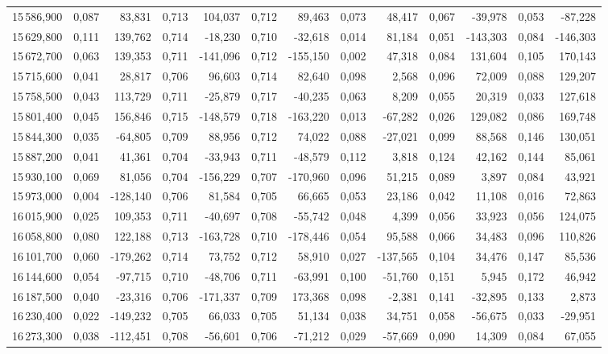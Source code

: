 \begin{longtable}{rrrrrrrrrrrrr}
15\,586,900 & 0,087 & 83,831 & 0,713 & 104,037 & 0,712 & 89,463 & 0,073 & 48,417 & 0,067 & -39,978 & 0,053 & -87,228\\
15\,629,800 & 0,111 & 139,762 & 0,714 & -18,230 & 0,710 & -32,618 & 0,014 & 81,184 & 0,051 & -143,303 & 0,084 & -146,303\\
15\,672,700 & 0,063 & 139,353 & 0,711 & -141,096 & 0,712 & -155,150 & 0,002 & 47,318 & 0,084 & 131,604 & 0,105 & 170,143\\
15\,715,600 & 0,041 & 28,817 & 0,706 & 96,603 & 0,714 & 82,640 & 0,098 & 2,568 & 0,096 & 72,009 & 0,088 & 129,207\\
15\,758,500 & 0,043 & 113,729 & 0,711 & -25,879 & 0,717 & -40,235 & 0,063 & 8,209 & 0,055 & 20,319 & 0,033 & 127,618\\
15\,801,400 & 0,045 & 156,846 & 0,715 & -148,579 & 0,718 & -163,220 & 0,013 & -67,282 & 0,026 & 129,082 & 0,086 & 169,748\\
15\,844,300 & 0,035 & -64,805 & 0,709 & 88,956 & 0,712 & 74,022 & 0,088 & -27,021 & 0,099 & 88,568 & 0,146 & 130,051\\
15\,887,200 & 0,041 & 41,361 & 0,704 & -33,943 & 0,711 & -48,579 & 0,112 & 3,818 & 0,124 & 42,162 & 0,144 & 85,061\\
15\,930,100 & 0,069 & 81,056 & 0,704 & -156,229 & 0,707 & -170,960 & 0,096 & 51,215 & 0,089 & 3,897 & 0,084 & 43,921\\
15\,973,000 & 0,004 & -128,140 & 0,706 & 81,584 & 0,705 & 66,665 & 0,053 & 23,186 & 0,042 & 11,108 & 0,016 & 72,863\\
16\,015,900 & 0,025 & 109,353 & 0,711 & -40,697 & 0,708 & -55,742 & 0,048 & 4,399 & 0,056 & 33,923 & 0,056 & 124,075\\
16\,058,800 & 0,080 & 122,188 & 0,713 & -163,728 & 0,710 & -178,446 & 0,054 & 95,588 & 0,066 & 34,483 & 0,096 & 110,826\\
16\,101,700 & 0,060 & -179,262 & 0,714 & 73,752 & 0,712 & 58,910 & 0,027 & -137,565 & 0,104 & 34,476 & 0,147 & 85,536\\
16\,144,600 & 0,054 & -97,715 & 0,710 & -48,706 & 0,711 & -63,991 & 0,100 & -51,760 & 0,151 & 5,945 & 0,172 & 46,942\\
16\,187,500 & 0,040 & -23,316 & 0,706 & -171,337 & 0,709 & 173,368 & 0,098 & -2,381 & 0,141 & -32,895 & 0,133 & 2,873\\
16\,230,400 & 0,022 & -149,232 & 0,705 & 66,033 & 0,705 & 51,134 & 0,038 & 34,751 & 0,058 & -56,675 & 0,033 & -29,951\\
16\,273,300 & 0,038 & -112,451 & 0,708 & -56,601 & 0,706 & -71,212 & 0,029 & -57,669 & 0,090 & 14,309 & 0,084 & 67,055\\

\end{longtable}
